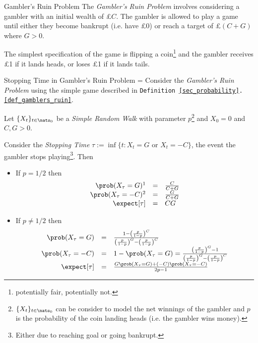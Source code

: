 \documentclass[11pt,a4paper]{article}
\begin{document}
  \begin{definition}{Gambler's Ruin Problem}\label{def_gamblers_ruin}
    The \textit{Gambler's Ruin Problem} involves considering a gambler with an initial wealth of £$C$. The gambler is allowed to play a game until either they become bankrupt (i.e. have £0) or reach a target of £$(C+G)$ where $G>0$.
    \par The simplest specification of the game is flipping a coin\footnote{potentially fair, potentially not.} and the gambler receives £1 if it lands heads, or loses £1 if it lands tails.
  \end{definition}

  \begin{proposition}{Stopping Time in Gambler's Ruin Problem}\label{prop_stopping_time_gamblers_ruin}
    \everymath={\displaystyle}
    Consider the \textit{Gambler's Ruin Problem} using the simple game described in \texttt{Definition \ref{sec_probability}.\ref{def_gamblers_ruin}}.
    \par Let $\{X_t\}_{t\in\nats_0}$ be a \textit{Simple Random Walk} with parameter $p$\footnote{$\{X_t\}_{t\in\nats_0}$ can be consider to model the net winnings of the gambler and $p$ is the probability of the coin landing heads (i.e. the gambler wins money).} and $X_0=0$ and $C,G>0$.
    \par Consider the \textit{Stopping Time} $\tau:=\inf\{t:X_t=G\text{ or }X_t=-C\}$, the event the gambler stops playing\footnote{Either due to reaching goal or going bankrupt.}. Then
    \begin{itemize}
      \item If $p=1/2$ then
        \[\begin{array}{rcl}
          \prob(X_\tau=G)\footnotemark&=&\frac{C}{C+G}\\
          \prob(X_\tau=-C)\footnotemark&=&\frac{G}{C+G}\\
          \expect[\tau]&=&CG
        \end{array}\]
      \item If $p\neq1/2$ then
        \[\begin{array}{rcl}
          \prob(X_\tau=G)&=&\frac{1-\left(\frac{p}{1-p}\right)^C}{\left(\frac{p}{1-p}\right)^G-\left(\frac{p}{1-p}\right)^C}\\
          \prob(X_\tau=-C)&=&1-\prob(X_\tau=G)=\frac{\left(\frac{p}{1-p}\right)^G-1}{\left(\frac{p}{1-p}\right)^G-\left(\frac{p}{1-p}\right)^C}\\
          \expect[\tau]&=&\frac{G\prob(X_\tau=G)+(-C)\prob(X_\tau=-C)}{2p-1}
        \end{array}\]
    \end{itemize}
  \end{proposition}
\end{document}
